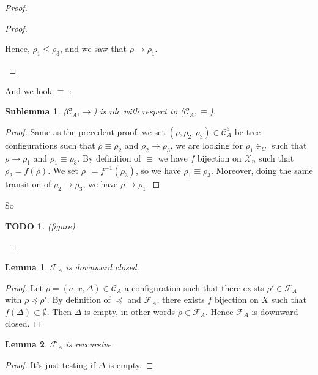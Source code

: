 \documentclass[a4paper,10pt]{report}
\newtheorem{lm}{Lemma}[thr]
\newtheorem{slm}{Sublemma}[lm]
\newtheorem{td}{TODO}
\newcommand{\C}{\mathcal{C}_{A}}
\newcommand{\F}{\mathcal{F}_{A}}
\newcommand{\X}{\mathcal{X}_{n}}
\begin{document}
\begin{proof}
\begin{proof}
\begin{itemize}
     Hence, $\rho_1 \leq \rho_3$, and we saw that $\rho \rightarrow \rho_1$.
   \end{itemize}   
  \end{proof}
  And we look $\equiv$ :
  \begin{slm}
    ($\C$,$\rightarrow$) is rdc with respect to ($\C,\equiv$).
  \end{slm}
  \begin{proof}
    Same as the precedent proof: we set $(\rho, \rho_2  , \rho_3) \in \C^3 $ be tree configurations 
   such that $\rho \equiv \rho_2$ and $\rho_2 \rightarrow \rho_3$, we are looking for $\rho_1 \in _C$ such that $\rho \rightarrow \rho_1$  and $\rho_1 \equiv \rho_3$.
   By definition of $\equiv$ we have $f$ bijection on $\X$ such that $\rho_2 = f(\rho)$.  We set $\rho_1 = f^{-1}(\rho_3)$, so we have $\rho_1 \equiv \rho_3$.
   Moreover, doing the same transition of $\rho_2 \rightarrow \rho_3$, we have $\rho \rightarrow \rho_1$.    
  \end{proof}
   So 
   \begin{td}
      (figure)
  
   \end{td}

  
\end{proof}


\begin{lm} \label{cd5}
  $\F$ is downward closed. 
\end{lm}
\begin{proof}
  Let $\rho=(a,x,\Delta) \in \C$ a configuration such that there exists $\rho' \in \F$ with $\rho \preceq \rho'$.
  By definition of $\preceq$ and $\F$, there exists $f$ bijection on $X$ such that $f(\Delta) \subset \emptyset$.
  Then $\Delta$ is empty, in other words $\rho \in \F$.
  Hence $\F$ is downward closed. 
\end{proof}

\begin{lm} \label{cd6}
  $\F$ is reccursive.
\end{lm}

\begin{proof}
  It's just testing if $\Delta$ is empty.
\end{proof}
\end{document}
